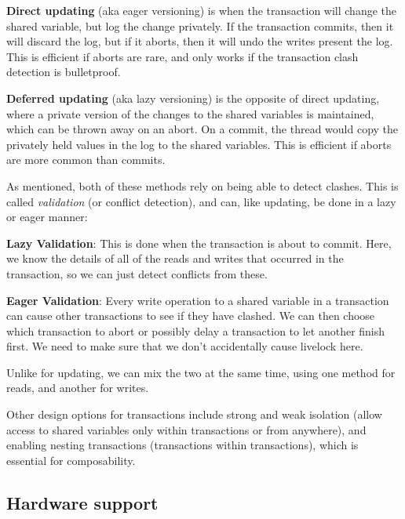 \begin{description}
\item \textbf{Direct updating} (aka eager versioning) is when the transaction will
change the shared variable, but log the change privately. If the
transaction commits, then it will discard the log, but if it aborts,
then it will undo the writes present the log. This is efficient if
aborts are rare, and only works if the transaction clash detection is
bulletproof.
\item \textbf{Deferred updating} (aka lazy versioning) is the opposite of
direct updating, where a private version of the changes to the shared
variables is maintained, which can be thrown away on an abort. On a
commit, the thread would copy the privately held values in the log to
the shared variables. This is efficient if aborts are more common than
commits.
\end{description}

As mentioned, both of these methods rely on being able to detect
clashes. This is called \textit{validation} (or conflict detection),
and can, like updating, be done in a lazy or eager manner:

\begin{description}
\item \textbf{Lazy Validation}: This is done when the transaction is
about to commit. Here, we know the details of all of the reads and
writes that occurred in the transaction, so we can just detect
conflicts from these.
\item \textbf{Eager Validation}: Every write operation to a shared
variable in a transaction can cause other transactions to see if they
have clashed. We can then choose which transaction to abort or
possibly delay a transaction to let another finish first. We need to
make sure that we don't accidentally cause livelock here.
\end{description}

Unlike for updating, we can mix the two at the same time, using one
method for reads, and another for writes.

Other design options for transactions include strong and weak
isolation (allow access to shared variables only within transactions
or from anywhere), and enabling nesting transactions (transactions
within transactions), which is essential for composability.

\subsection{Hardware support}

